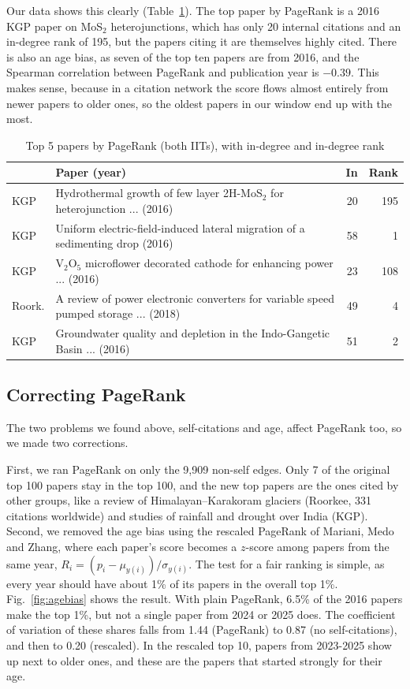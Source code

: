 \documentclass[conference,10pt]{IEEEtran}
\begin{document}
Our data shows this clearly (Table~\ref{tab:pr}). The top paper by PageRank is a 2016 KGP paper on MoS$_2$
heterojunctions, which has only 20 internal citations and an in-degree rank of 195, but the papers citing it are
themselves highly cited. There is also an age bias, as seven of the top ten papers are from 2016, and the Spearman
correlation between PageRank and publication year is $-0.39$. This makes sense, because in a citation network the
score flows almost entirely from newer papers to older ones, so the oldest papers in our window end up with the most.

\begin{table}[!t]
\centering
\caption{Top 5 papers by PageRank (both IITs), with in-degree and in-degree rank}
\label{tab:pr}
\footnotesize
\begin{tabular}{@{}l>{\raggedright\arraybackslash}p{4.4cm}rr@{}}
\toprule
 & \textbf{Paper (year)} & \textbf{In} & \textbf{Rank} \\
\midrule
KGP    & Hydrothermal growth of few layer 2H-MoS$_2$ for heterojunction ... (2016) & 20 & 195 \\
KGP    & Uniform electric-field-induced lateral migration of a sedimenting drop (2016) & 58 & 1 \\
KGP    & V$_2$O$_5$ microflower decorated cathode for enhancing power ... (2016) & 23 & 108 \\
Roork. & A review of power electronic converters for variable speed pumped storage ... (2018) & 49 & 4 \\
KGP    & Groundwater quality and depletion in the Indo-Gangetic Basin ... (2016) & 51 & 2 \\
\bottomrule
\end{tabular}
\end{table}

\subsection{Correcting PageRank}
The two problems we found above, self-citations and age, affect PageRank too, so we made two corrections.

First, we ran PageRank on only the 9,909 non-self edges. Only 7 of the original top 100 papers stay in the top 100, and
the new top papers are the ones cited by other groups, like a review of Himalayan--Karakoram glaciers (Roorkee, 331
citations worldwide) and studies of rainfall and drought over India (KGP). Second, we removed the age bias using the
rescaled PageRank of Mariani, Medo and Zhang, where each paper's score becomes a $z$-score among papers from the same
year, $R_i = (p_i - \mu_{y(i)})/\sigma_{y(i)}$. The test for a fair ranking is simple, as every year should have about
1\% of its papers in the overall top 1\%. Fig.~\ref{fig:agebias} shows the result. With plain PageRank, 6.5\% of the
2016 papers make the top 1\%, but not a single paper from 2024 or 2025 does. The coefficient of variation of these
shares falls from 1.44 (PageRank) to 0.87 (no self-citations), and then to 0.20 (rescaled). In the rescaled top 10,
papers from 2023-2025 show up next to older ones, and these are the papers that started strongly for their age.
\end{document}
